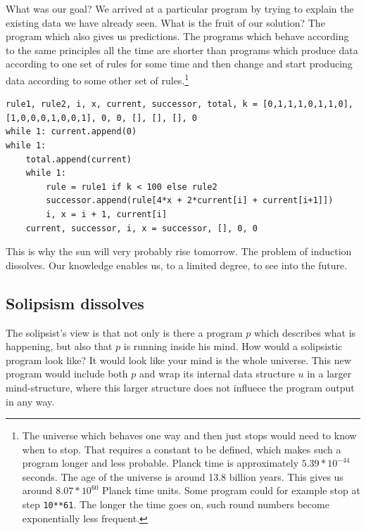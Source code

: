 \documentclass[oneside,hidelinks]{article}
\begin{document}
What was our goal?
We arrived at a particular program by trying to explain the existing data we have already seen.
What is the fruit of our solution?
The program which also gives us predictions.
The programs which behave according to the same principles all the time are shorter than programs which produce data according to one set of rules for some time and then change and start producing data according to some other set of rules.\footnote{
The universe which behaves one way and then just stops would need to know when to stop.
That requires a constant to be defined, which makes such a program longer and less probable.
Planck time is approximately $5.39 * 10^{−44}$ seconds.
The age of the universe is around 13.8 billion years.
This gives us around $8.07 * 10^{60}$ Planck time units.
Some program could for example stop at step \texttt{10**61}.
The longer the time goes on, such round numbers become exponentially less frequent.
}

\begin{lstlisting}[caption={A short program using one rule for the first 100 time steps, another rule from then on. This program is longer than just using the same rule all the time.}]
rule1, rule2, i, x, current, successor, total, k = [0,1,1,1,0,1,1,0], [1,0,0,0,1,0,0,1], 0, 0, [], [], [], 0
while 1: current.append(0)
while 1:
	total.append(current)
	while 1:
		rule = rule1 if k < 100 else rule2
		successor.append(rule[4*x + 2*current[i] + current[i+1]])
		i, x = i + 1, current[i]
	current, successor, i, x = successor, [], 0, 0
\end{lstlisting}

This is why the sun will very probably rise tomorrow.
The problem of induction dissolves.
Our knowledge enables us, to a limited degree, to see into the future.

\newpage

\subsection{Solipsism dissolves}

The solipsist's view is that not only is there a program $p$ which describes what is happening, but also that $p$ is running inside his mind.
How would a solipsistic program look like?
It would look like your mind is the whole universe.
This new program would include both $p$ and wrap its internal data structure $u$ in a larger mind-structure, where this larger structure does not influece the program output in any way.
\end{document}
